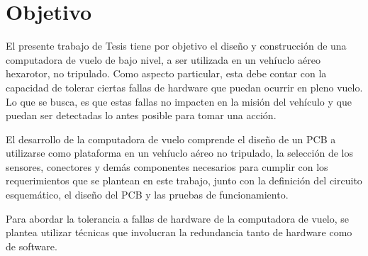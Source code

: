 \section{Objetivo}

El presente trabajo de Tesis tiene por objetivo el diseño y construcción de una computadora de vuelo de bajo nivel, a ser utilizada en un vehíuclo aéreo hexarotor, no tripulado. Como aspecto particular, esta debe contar con la capacidad de tolerar ciertas fallas de hardware que puedan ocurrir en pleno vuelo. Lo que se busca, es que estas fallas no impacten en la misión del vehículo y que puedan ser detectadas lo antes posible para tomar una acción.

El desarrollo de la computadora de vuelo comprende el diseño de un PCB a utilizarse como plataforma en un vehíuclo aéreo no tripulado, la selección de los sensores, conectores y demás componentes necesarios para cumplir con los requerimientos que se plantean en este trabajo, junto con la definición del circuito esquemático, el diseño del PCB y las pruebas de funcionamiento.

Para abordar la tolerancia a fallas de hardware de la computadora de vuelo, se plantea utilizar técnicas que involucran la redundancia tanto de hardware como de software.